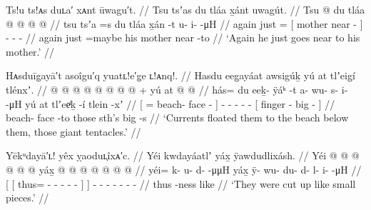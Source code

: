 \ex\label{ex:91-219-again-go-to-mother}%
%
\begingl
	\glpreamble	Ts!u ts!ᴀs duʟa′ xᴀnt ūwagu′t. //
	\glpreamble	Tsu tsʼas du tláa x̱ánt uwagút. //
	\gla	Tsu  @ {} {} du tláa  @ {} {}
		 @ {} @ {} @ {} //
	\glb	tsu tsʼa =s {} du tláa x̱án -t {}
		u- i-  -μH //
	\glc	again just = {}[  mother near - {}]
		- -  - //
	\gld	again just =maybe {} his mother near -to {}
		 {} {} {} //
	\glft	‘Again he just goes near to his mother.’
		//
\endgl
\xe

\ex\label{ex:91-220-big-tentacles-floated-to-beach}%
%
\begingl
	\glpreamble	Hᴀsduīg̣ayā′t asoîgu′q yuatʟ!e′g̣e ʟ!ᴀnq!. //
	\glpreamble	Hasdu eeg̱ayáat awsigúḵ yú at tlʼeig̱í tlénxʼ. //
	\gla	{}  @ {}  @ {} @ {} {}
		 @ {} @ {} @ {} @ {} @ {} +
		{} yú at  @ {}  @ {} {} //
	\glb	{} hás= du eeḵ- ÿáᵏ -t {}
		a- wu- s- i-  -μH
		{} yú at tlʼeeͥḵ -í tlein -xʼ {} //
	\glc	{}[ =  beach- face - {}]
		- - - -  -
		{}[   finger - big - {}] //
	\gld	{}  {} beach- face -to {}
		 {} {} {} {} {}
		{} those sth’s  {} big -s {} //
	\glft	‘Currents floated them to the beach below them, those giant tentacles.’
		//
\endgl
\xe

\ex\label{ex:91-221-cut-small-pieces}%
%
\begingl
	\glpreamble	Yēkᵘdayā′ʟ! yêx ỵaoduʟ̣îxᴀ′c. //
	\glpreamble	Yéi kwdayáatlʼ yáx̱ ÿawdudlixásh. //
	\gla	{} {} Yéi @  @ {} @ {} @ {} @ {} @ {} {} yáx̱ {}
		 @ {} @ {} @ {} @ {} @ {} @ {} @ {} //
	\glb	{} {} yéi= k- u- d-  -μμH {} {} yáx̱ {}
		ÿ- wu- du- d- l- i-  -μH //
	\glc	{}[ {}[ thus= - - -
			 - - {}]  {}]
		- - - - - -
			 - //
	\gld	{} {} thus  {} {} {} {} -ness {}
			like {}
		 {} {} {} {} {} {} {} //
	\glft	‘They were cut up like small pieces.’
		//
\endgl
\xe


